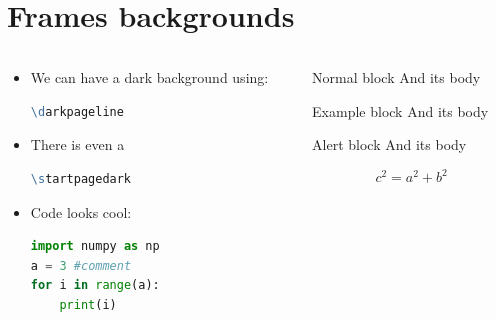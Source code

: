 \documentclass[aspectratio=1610,11pt]{beamer}
\begin{document}
\section{Frames backgrounds}
\darkpageline
\begin{frame}[fragile]{\insertsection}
\begin{columns}
\begin{column}{0.5\textwidth}
    \begin{itemize}
        \item We can have a dark background using: 
        \begin{lstlisting}[language=tcl,numbers=none]
\darkpageline\end{lstlisting}
        \item There is even a 
        \begin{lstlisting}[language=tcl,numbers=none]
\startpagedark\end{lstlisting}
    \item Code looks cool:
        \begin{lstlisting}[language=Python]
import numpy as np
a = 3 #comment
for i in range(a):
    print(i)\end{lstlisting}
    \end{itemize}
    \end{column}

\begin{column}{0.5\textwidth}
    \begin{block}{Normal block}
    And its body
    \end{block}
    \begin{exampleblock}{Example block}
    And its body
    \end{exampleblock}
    \begin{alertblock}{Alert block}
    And its body
    \end{alertblock}
    \begin{equation}
        c^2 = a^2 + b^2
    \end{equation}
    \end{column}
    \end{columns}
\end{frame}
\startpagedark
\begin{frame}
    \maketitle
\end{frame}
\end{document}
